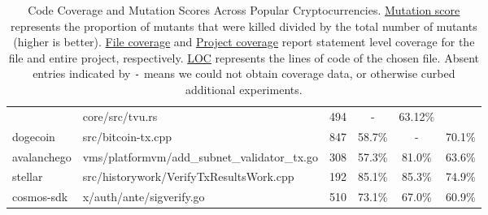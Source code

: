 \begin{table}[ht!]
\begin{tabular}{llrccc}
                                & core/src/tvu.rs                               &  494             & -                       & 63.12\%                 &                          \\
\cmidrule{2-6}
dogecoin                        & src/bitcoin-tx.cpp                            & 847              & 58.7\%                  & -                       & 70.1\%                   \\
\cmidrule{2-6}
avalanchego                     & vms/platformvm/add\_subnet\_validator\_tx.go  & 308              & 57.3\%                  & 81.0\%                  & 63.6\%                   \\
\cmidrule{2-6}
  stellar                       & src/historywork/VerifyTxResultsWork.cpp       & 192              & 85.1\%                  & 85.3\%                  & 74.9\%                   \\
\cmidrule{2-6}
cosmos-sdk                      & x/auth/ante/sigverify.go                      & 510              & 73.1\%                  & 67.0\%                  & 60.9\%                   \\
\bottomrule
\end{tabular}
\caption{Code Coverage and Mutation Scores Across Popular Cryptocurrencies. \underline{Mutation score} represents the proportion of mutants that were killed divided by the total number of mutants (higher is better).
\underline{File coverage} and \underline{Project coverage} report statement level coverage for the file and entire project, respectively. \underline{LOC} represents the lines of code of the chosen file. Absent entries indicated by \texttt{-} means we could not
obtain coverage data, or otherwise curbed additional experiments.
}
\label{tab:comparison}
\end{table}


